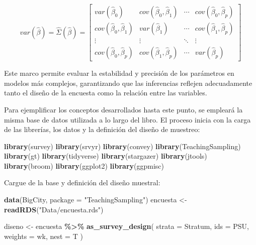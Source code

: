 \documentclass[
  spanish,
  12pt,
]{book}
\newenvironment{Shaded}{\begin{snugshade}}{\end{snugshade}}
\newcommand{\AttributeTok}[1]{\textcolor[rgb]{0.13,0.29,0.53}{#1}}
\newcommand{\FunctionTok}[1]{\textcolor[rgb]{0.13,0.29,0.53}{\textbf{#1}}}
\newcommand{\NormalTok}[1]{#1}
\newcommand{\OtherTok}[1]{\textcolor[rgb]{0.56,0.35,0.01}{#1}}
\newcommand{\SpecialCharTok}[1]{\textcolor[rgb]{0.81,0.36,0.00}{\textbf{#1}}}
\newcommand{\StringTok}[1]{\textcolor[rgb]{0.31,0.60,0.02}{#1}}
\begin{document}
\[
var(\hat{\beta}) = \hat{\Sigma}(\hat{\beta}) =
\begin{bmatrix}
var(\hat{\beta}_{0}) & cov(\hat{\beta}_{0},\hat{\beta}_{1}) & \cdots & cov(\hat{\beta}_{0},\hat{\beta}_{p}) \\
cov(\hat{\beta}_{0},\hat{\beta}_{1}) & var(\hat{\beta}_{1}) & \cdots & cov(\hat{\beta}_{1},\hat{\beta}_{p}) \\
\vdots & \vdots & \ddots & \vdots \\
cov(\hat{\beta}_{0},\hat{\beta}_{p}) & cov(\hat{\beta}_{1},\hat{\beta}_{p}) & \cdots & var(\hat{\beta}_{p})
\end{bmatrix}
\]

Este marco permite evaluar la estabilidad y precisión de los parámetros en modelos más complejos, garantizando que las inferencias reflejen adecuadamente tanto el diseño de la encuesta como la relación entre las variables.

Para ejemplificar los conceptos desarrollados hasta este punto, se empleará la misma base de datos utilizada a lo largo del libro. El proceso inicia con la carga de las librerías, los datos y la definición del diseño de muestreo:

\begin{Shaded}
\begin{Highlighting}[]
\FunctionTok{library}\NormalTok{(survey)}
\FunctionTok{library}\NormalTok{(srvyr)}
\FunctionTok{library}\NormalTok{(convey)}
\FunctionTok{library}\NormalTok{(TeachingSampling)}
\FunctionTok{library}\NormalTok{(gt)}
\FunctionTok{library}\NormalTok{(tidyverse)}
\FunctionTok{library}\NormalTok{(stargazer)}
\FunctionTok{library}\NormalTok{(jtools)}
\FunctionTok{library}\NormalTok{(broom)}
\FunctionTok{library}\NormalTok{(ggplot2)}
\FunctionTok{library}\NormalTok{(ggpmisc)}
\end{Highlighting}
\end{Shaded}

Cargue de la base y definición del diseño muestral:

\begin{Shaded}
\begin{Highlighting}[]
\FunctionTok{data}\NormalTok{(BigCity, }\AttributeTok{package =} \StringTok{"TeachingSampling"}\NormalTok{)}
\NormalTok{encuesta }\OtherTok{\textless{}{-}} \FunctionTok{readRDS}\NormalTok{(}\StringTok{"Data/encuesta.rds"}\NormalTok{)}

\NormalTok{diseno }\OtherTok{\textless{}{-}}\NormalTok{ encuesta }\SpecialCharTok{\%\textgreater{}\%}
  \FunctionTok{as\_survey\_design}\NormalTok{(}
    \AttributeTok{strata =}\NormalTok{ Stratum,}
    \AttributeTok{ids =}\NormalTok{ PSU,}
    \AttributeTok{weights =}\NormalTok{ wk,}
    \AttributeTok{nest =}\NormalTok{ T}
\NormalTok{  )}
\end{Highlighting}
\end{Shaded}
\end{document}
